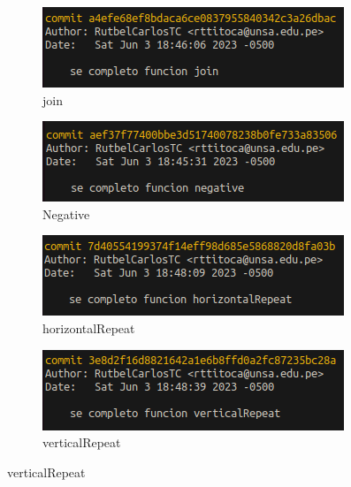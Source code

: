 \documentclass{article}
\begin{document}
\begin{itemize}
\begin{figure}[H]
        \vspace{0.5cm} %
        
        \begin{subfigure}[b]{0.4\textwidth}
          \centering
          \includegraphics[scale=0.5]{img/commits/join.png}
          \caption{join}
        \end{subfigure}
        \hfill
        \begin{subfigure}[b]{0.4\textwidth}
          \centering
          \includegraphics[scale=0.5]{img/commits/negative.png}
          \caption{Negative}
        \end{subfigure}
        
        \vspace{0.5cm} %
        
        \begin{subfigure}[b]{0.4\textwidth}
          \centering
          \includegraphics[scale=0.5]{img/commits/horizontalRepeat.png}
          \caption{horizontalRepeat}
        \end{subfigure}
        \hfill
        \begin{subfigure}[b]{0.4\textwidth}
          \centering
          \includegraphics[scale=0.5]{img/commits/verticalRepeat.png}
          \caption{verticalRepeat}
        \end{subfigure}
  

\end{figure}
\end{itemize}
\end{document}

